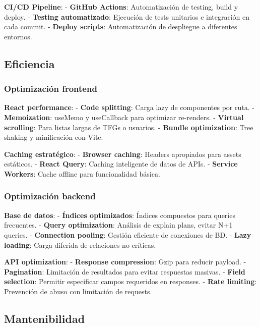 \documentclass[12pt,a4paper,oneside]{report}
\begin{document}
\textbf{CI/CD Pipeline}: - \textbf{GitHub Actions}: Automatización de
testing, build y deploy. - \textbf{Testing automatizado}: Ejecución de
tests unitarios e integración en cada commit. - \textbf{Deploy scripts}:
Automatización de despliegue a diferentes entornos.

\subsection{Eficiencia}\label{eficiencia}

\subsubsection{Optimización frontend}\label{optimizaciuxf3n-frontend}

\textbf{React performance}: - \textbf{Code splitting}: Carga lazy de
componentes por ruta. - \textbf{Memoization}: useMemo y useCallback para
optimizar re-renders. - \textbf{Virtual scrolling}: Para listas largas
de TFGs o usuarios. - \textbf{Bundle optimization}: Tree shaking y
minificación con Vite.

\textbf{Caching estratégico}: - \textbf{Browser caching}: Headers
apropiados para assets estáticos. - \textbf{React Query}: Caching
inteligente de datos de APIs. - \textbf{Service Workers}: Cache offline
para funcionalidad básica.

\subsubsection{Optimización backend}\label{optimizaciuxf3n-backend}

\textbf{Base de datos}: - \textbf{Índices optimizados}: Índices
compuestos para queries frecuentes. - \textbf{Query optimization}:
Análisis de explain plans, evitar N+1 queries. - \textbf{Connection
pooling}: Gestión eficiente de conexiones de BD. - \textbf{Lazy
loading}: Carga diferida de relaciones no críticas.

\textbf{API optimization}: - \textbf{Response compression}: Gzip para
reducir payload. - \textbf{Pagination}: Limitación de resultados para
evitar respuestas masivas. - \textbf{Field selection}: Permitir
especificar campos requeridos en responses. - \textbf{Rate limiting}:
Prevención de abuso con limitación de requests.

\subsection{Mantenibilidad}\label{mantenibilidad-1}
\end{document}
